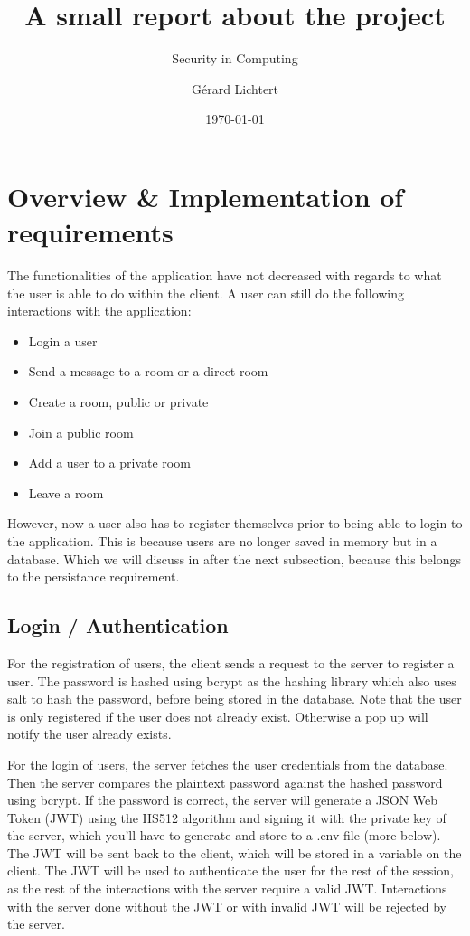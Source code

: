 \documentclass[a4paper]{article}
\title{A small report about the project}
\subtitle{Security in Computing}
\author{Gérard Lichtert}
\date{\today}
\begin{document}
\maketitle
\raggedright{}
\tableofcontents%
\newpage
\section{Overview \& Implementation of requirements}
The functionalities of the application have not decreased with regards to what the user is able to do within the client. A user can still do the following interactions with the application:
\begin{itemize}
    \item Login a user
    \item Send a message to a room or a direct room
    \item Create a room, public or private
    \item Join a public room
    \item Add a user to a private room
    \item Leave a room
\end{itemize}
However, now a user also has to register themselves prior to being able to login to the application. This is because users are no longer saved in memory but in a database. Which we will discuss in after the next subsection, because this belongs to the persistance requirement.

\subsection{Login / Authentication}
For the registration of users, the client sends a request to the server to register a user. The password is hashed using bcrypt as the hashing library which also uses salt to hash the password, before being stored in the database. Note that the user is only registered if the user does not already exist. Otherwise a pop up will notify the user already exists.

For the login of users, the server fetches the user credentials from the database. Then the server compares the plaintext password against the hashed password using bcrypt. If the password is correct, the server will generate a JSON Web Token (JWT) using the HS512 algorithm and signing it with the private key of the server, which you'll have to generate and store to a .env file (more below). The JWT will be sent back to the client, which will be stored in a variable on the client. The JWT will be used to authenticate the user for the rest of the session, as the rest of the interactions with the server require a valid JWT. Interactions with the server done without the JWT or with invalid JWT will be rejected by the server.
\end{document}
